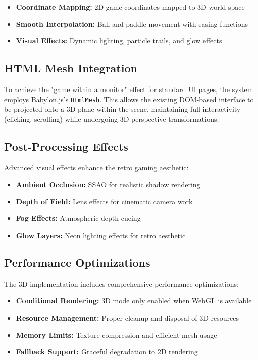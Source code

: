 \documentclass[11pt,a4paper]{report}
\begin{document}
\begin{itemize}
  \item \textbf{Coordinate Mapping:} 2D game coordinates mapped to 3D world space
  \item \textbf{Smooth Interpolation:} Ball and paddle movement with easing functions
  \item \textbf{Visual Effects:} Dynamic lighting, particle trails, and glow effects
\end{itemize}

\subsection{HTML Mesh Integration}

To achieve the "game within a monitor" effect for standard UI pages, the system employs Babylon.js's \texttt{HtmlMesh}. This allows the existing DOM-based interface to be projected onto a 3D plane within the scene, maintaining full interactivity (clicking, scrolling) while undergoing 3D perspective transformations.


\subsection{Post-Processing Effects}

Advanced visual effects enhance the retro gaming aesthetic:

\begin{itemize}
  \item \textbf{Ambient Occlusion:} SSAO for realistic shadow rendering
  \item \textbf{Depth of Field:} Lens effects for cinematic camera work
  \item \textbf{Fog Effects:} Atmospheric depth cueing
  \item \textbf{Glow Layers:} Neon lighting effects for retro aesthetic
\end{itemize}

\subsection{Performance Optimizations}

The 3D implementation includes comprehensive performance optimizations:

\begin{itemize}
  \item \textbf{Conditional Rendering:} 3D mode only enabled when WebGL is available
  \item \textbf{Resource Management:} Proper cleanup and disposal of 3D resources
  \item \textbf{Memory Limits:} Texture compression and efficient mesh usage
  \item \textbf{Fallback Support:} Graceful degradation to 2D rendering
\end{itemize}
\end{document}
